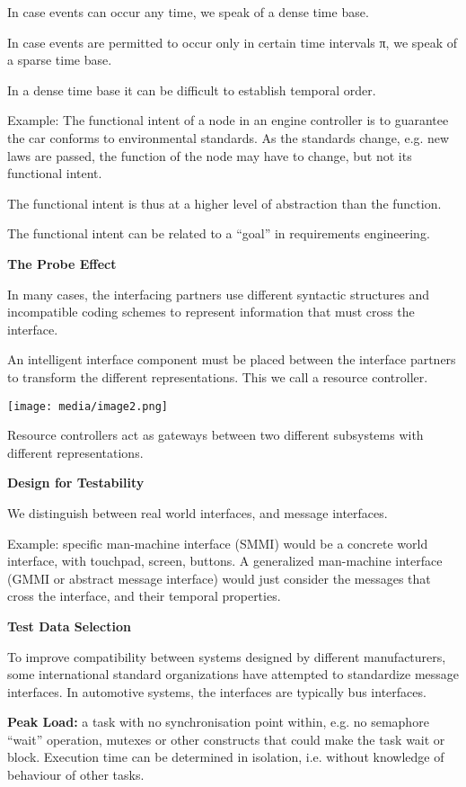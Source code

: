 In case events can occur any time, we speak of a dense time base.

In case events are permitted to occur only in certain time intervals π,
we speak of a sparse time base.

In a dense time base it can be difficult to establish temporal order.

Example: The functional intent of a node in an engine controller is to
guarantee the car conforms to environmental standards. As the standards
change, e.g. new laws are passed, the function of the node may have to
change, but not its functional intent.

The functional intent is thus at a higher level of abstraction than the
function.

The functional intent can be related to a ``goal'' in requirements
engineering.

\textbf{The Probe Effect}

In many cases, the interfacing partners use different syntactic
structures and incompatible coding schemes to represent information that
must cross the interface.

An intelligent interface component must be placed between the interface
partners to transform the different representations. This we call a
resource controller.

\texttt{[image: media/image2.png]}

Resource controllers act as gateways between two different subsystems
with different representations.

\textbf{Design for Testability}

We distinguish between real world interfaces, and message interfaces.

Example: specific man-machine interface (SMMI) would be a concrete world
interface, with touchpad, screen, buttons. A generalized man-machine
interface (GMMI or abstract message interface) would just consider the
messages that cross the interface, and their temporal properties.

\textbf{Test Data Selection}

To improve compatibility between systems designed by different
manufacturers, some international standard organizations have attempted
to standardize message interfaces. In automotive systems, the interfaces
are typically bus interfaces.

\textbf{Peak Load:} a task with no synchronisation point within, e.g. no
semaphore ``wait'' operation, mutexes or other constructs that could
make the task wait or block. Execution time can be determined in
isolation, i.e. without knowledge of behaviour of other tasks.

